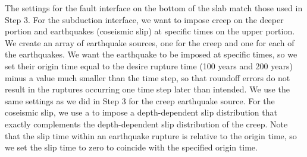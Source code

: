 The settings for the fault interface on the bottom of the slab match
those used in Step 3. For the subduction interface, we want to
impose creep on the deeper portion and earthquakes (coseismic slip) at
specific times on the upper portion. We create an array of earthquake
sources, one for the creep and one for each of the earthquakes. We
want the earthquake to be imposed at specific times, so we set their
origin time equal to the desire rupture time (100 years and 200 years)
minus a value much smaller than the time step, so that roundoff errors
do not result in the ruptures occurring one time step later than
intended.  We use the same settings as we did in Step 3 for the creep
earthquake source. For the coseismic slip, we use a
 to impose a depth-dependent slip distribution
that exactly complements the depth-dependent slip distribution of the
creep. Note that the slip time within an earthquake rupture is
relative to the origin time, so we set the slip time to zero to
coincide with the specified origin time.
